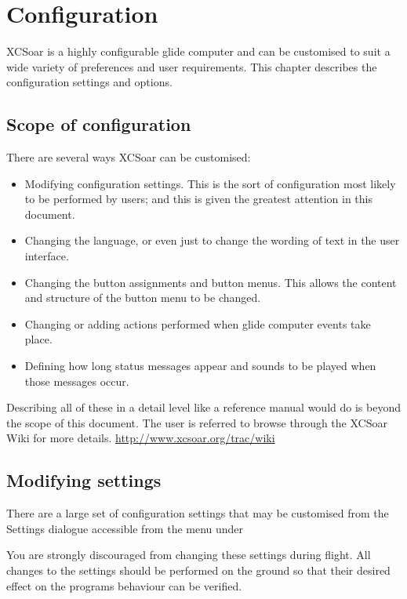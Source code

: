 \chapter{Configuration}\label{cha:configuration}
XCSoar is a highly configurable glide computer and can be customised
to suit a wide variety of preferences and user requirements.  This
chapter describes the configuration settings and options.

\section{Scope of configuration}

There are several ways XCSoar can be customised:
\begin{itemize}

\item Modifying configuration settings.  This is the sort of configuration
 most likely to be performed by users; and this is given the greatest attention in this document.
\item Changing the language, or even just to change the wording
  of text in the user interface.
\item Changing the button assignments and button menus.  This allows 
the content and structure of the button menu to be changed. 
\item Changing or adding actions performed when glide computer events
 take place.
\item Defining how long status messages appear and sounds to be played
 when those messages occur.
\end{itemize}
Describing all of these in a detail level like a reference manual would 
do is beyond the scope of this document. The user is referred to browse 
through the XCSoar Wiki for more details. 
\url{http://www.xcsoar.org/trac/wiki}

\section{Modifying settings}

There are a large set of configuration settings that may be customised
from the Settings dialogue accessible from the menu under
\begin{quote}
\blink{}\blink{}
\end{quote}

You are strongly discouraged from changing these settings during
flight.  \warning  All changes to the settings should be performed on the ground
so that their desired effect on the programs behaviour can be
verified.

